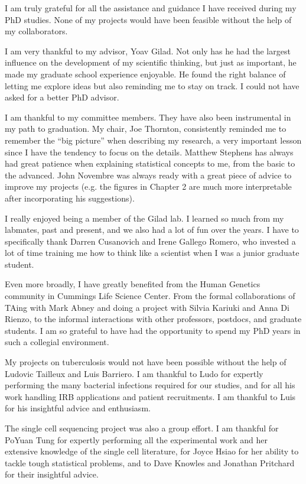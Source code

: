 \acknowledgments

I am truly grateful for all the assistance and guidance I have
received during my PhD studies. None of my projects would have been
feasible without the help of my collaborators.

I am very thankful to my advisor, Yoav Gilad. Not only has he had the
largest influence on the development of my scientific thinking, but
just as important, he made my graduate school experience enjoyable. He
found the right balance of letting me explore ideas but also reminding
me to stay on track. I could not have asked for a better PhD advisor.

I am thankful to my committee members. They have also been
instrumental in my path to graduation. My chair, Joe Thornton,
consistently reminded me to remember the ``big picture'' when
describing my research, a very important lesson since I have the
tendency to focus on the details. Matthew Stephens has always had
great patience when explaining statistical concepts to me, from the
basic to the advanced. John Novembre was always ready with a great
piece of advice to improve my projects (e.g. the figures in Chapter 2
are much more interpretable after incorporating his suggestions).

I really enjoyed being a member of the Gilad lab. I learned so much
from my labmates, past and present, and we also had a lot of fun over
the years. I have to specifically thank Darren Cusanovich and Irene
Gallego Romero, who invested a lot of time training me how to think
like a scientist when I was a junior graduate student.

Even more broadly, I have greatly benefited from the Human Genetics
community in Cummings Life Science Center. From the formal
collaborations of TAing with Mark Abney and doing a project with
Silvia Kariuki and Anna Di Rienzo, to the informal interactions with
other professors, postdocs, and graduate students. I am so grateful to
have had the opportunity to spend my PhD years in such a collegial
environment.

My projects on tuberculosis would not have been possible without the
help of Ludovic Tailleux and Luis Barriero. I am thankful to Ludo for
expertly performing the many bacterial infections required for our
studies, and for all his work handling IRB applications and patient
recruitments. I am thankful to Luis for his insightful advice and
enthusiasm.

The single cell sequencing project was also a group effort. I am
thankful for PoYuan Tung for expertly performing all the experimental
work and her extensive knowledge of the single cell literature, for
Joyce Hsiao for her ability to tackle tough statistical problems, and
to Dave Knowles and Jonathan Pritchard for their insightful advice.

